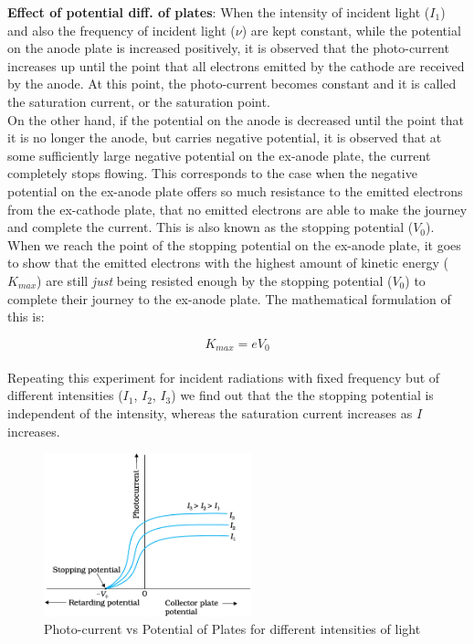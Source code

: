 \documentclass{article}
\begin{document}
\textbf{Effect of potential diff. of plates}: When the intensity of incident light ($I_{1}$) and also the frequency of incident light ($\nu$) are kept constant, while the potential on the anode plate is increased positively, it is observed that the photo-current increases up until the point that all electrons emitted by the cathode are received by the anode. At this point, the photo-current becomes constant and it is called the saturation current, or the saturation point. \\ 

On the other hand, if the potential on the anode is decreased until the point that it is no longer the anode, but carries negative potential, it is observed that at some sufficiently large negative potential on the ex-anode plate, the current completely stops flowing. This corresponds to the case when the negative potential on the ex-anode plate offers so much resistance to the emitted electrons from the ex-cathode plate, that no emitted electrons are able to make the journey and complete the current. This is also known as the stopping potential ($V_{0}$). \\

When we reach the point of the stopping potential on the ex-anode plate, it goes to show that the emitted electrons with the highest amount of kinetic energy ($K_{max}$) are still \emph{just} being resisted enough by the stopping potential ($V_{0}$) to complete their journey to the ex-anode plate. The mathematical formulation of this is:

\begin{equation}
    K_{max} = eV_{0}
\end{equation}
\\
Repeating  this experiment for incident radiations with fixed frequency but of different intensities ($I_{1}$, $I_{2}$, $I_{3}$) we find out that the the stopping potential is independent of the intensity, whereas the saturation current increases as $I$ increases. 


\begin{figure}[htp]
    \centering
    \includegraphics[width=6cm]{cr4.png}
    \caption{Photo-current vs Potential of Plates for different intensities of light}
    \label{fig:galaxy}
    \end{figure}
\end{document}
